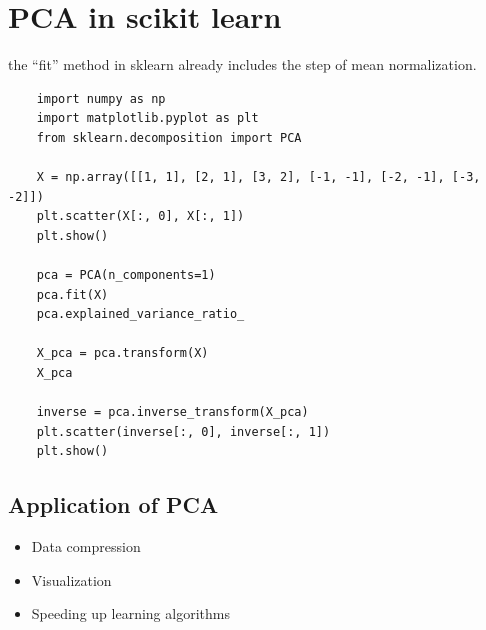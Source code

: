 \section{PCA in scikit learn}
\begin{notebox}
    the ``fit'' method in sklearn already includes the step of mean normalization.
\end{notebox}
\begin{verbatim}
    import numpy as np
    import matplotlib.pyplot as plt
    from sklearn.decomposition import PCA

    X = np.array([[1, 1], [2, 1], [3, 2], [-1, -1], [-2, -1], [-3, -2]])
    plt.scatter(X[:, 0], X[:, 1])
    plt.show()

    pca = PCA(n_components=1)
    pca.fit(X)
    pca.explained_variance_ratio_

    X_pca = pca.transform(X)
    X_pca

    inverse = pca.inverse_transform(X_pca)
    plt.scatter(inverse[:, 0], inverse[:, 1])
    plt.show()
\end{verbatim}

\subsection{Application of PCA}
\begin{itemize}
    \item Data compression
    \item Visualization
    \item Speeding up learning algorithms
\end{itemize}




